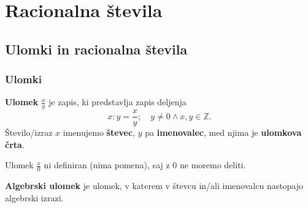 \section{Racionalna števila}

\begin{frame}
    \sectionpage

\end{frame}

\begin{frame}
\end{frame}

    \subsection{Ulomki in racionalna števila}

        \begin{frame}
            \frametitle{Ulomki}

            \begin{alertblock}{}
                \textbf{Ulomek} $\frac{x}{y}$ je zapis, ki predstavlja zapis deljenja $$x:y=\frac{x}{y};\quad y\neq 0\land x,y\in\mathbb{Z}.$$
                Število/izraz $x$ imenujemo \textbf{števec}, $y$ pa \textbf{imenovalec}, med njima je \textbf{ulomkova črta}.
            \end{alertblock}

            \begin{block}{}
                Ulomek $\frac{x}{0}$ ni definiran (nima pomena), saj z $0$ ne moremo deliti.
            \end{block}

            \begin{alertblock}{}
                \textbf{Algebrski ulomek} je ulomek, v katerem v števcu in/ali imenovalcu nastopajo algebrski izrazi.
            \end{alertblock}

        \end{frame}

